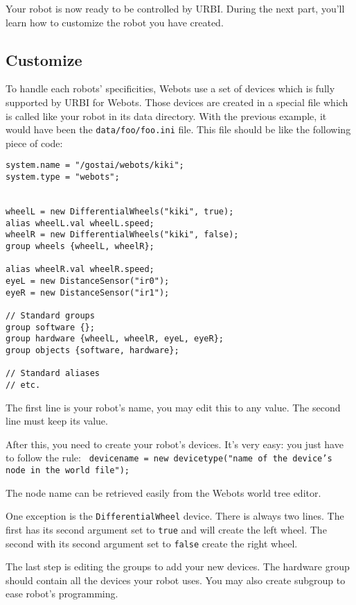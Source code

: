 Your robot is now ready to be controlled by URBI. During the next
part, you'll learn how to customize the robot you have created.


\subsection{Customize}
\label{webots.own.customize}%

To handle each robots' specificities, Webots use a set of devices
which is fully supported by URBI for Webots. Those devices are created
in a special file which is called like your robot in its data
directory. With the previous example, it would have been the
\nolinkurl{data/foo/foo.ini} file. This file should be like the
following piece of code:


\begin{lstlisting}[firstnumber=1,]
system.name = "/gostai/webots/kiki";
system.type = "webots";


wheelL = new DifferentialWheels("kiki", true);
alias wheelL.val wheelL.speed;
wheelR = new DifferentialWheels("kiki", false);
group wheels {wheelL, wheelR};

alias wheelR.val wheelR.speed;
eyeL = new DistanceSensor("ir0");
eyeR = new DistanceSensor("ir1");

// Standard groups
group software {};
group hardware {wheelL, wheelR, eyeL, eyeR};
group objects {software, hardware};

// Standard aliases
// etc.
\end{lstlisting}

The first line is your robot's name, you may edit this to any value.
The second line must keep its value.


After this, you need to create your robot's devices. It's very easy:
you just have to follow the rule: \texttt{
  d\-e\-v\-i\-c\-e\-n\-a\-m\-e = n\-e\-w
  d\-e\-v\-i\-c\-e\-t\-y\-p\-e\-(\-"\-n\-a\-m\-e o\-f t\-h\-e
  d\-e\-v\-i\-c\-e\-'\-s n\-o\-d\-e i\-n t\-h\-e w\-o\-r\-l\-d
  f\-i\-l\-e\-"\-)\-;\- }

The node name can be retrieved easily from the Webots world tree
editor.

One exception is the
\texttt{D\-i\-f\-f\-e\-r\-e\-n\-t\-i\-a\-l\-W\-h\-e\-e\-l} device.
There is always two lines. The first has its second argument set to
\texttt{t\-r\-u\-e} and will create the left wheel. The second with
its second argument set to \texttt{f\-a\-l\-s\-e} create the right
wheel.


The last step is editing the groups to add your new devices. The
hardware group should contain all the devices your robot uses. You may
also create subgroup to ease robot's programming.


